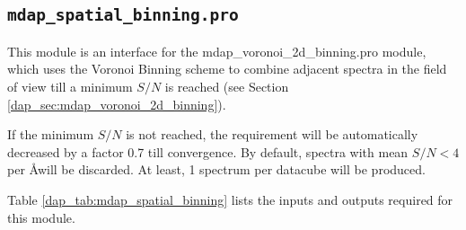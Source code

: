 \subsection{{\tt mdap\_spatial\_binning.pro}}
\label{dap_sec:mdap_spatial_binning}

This module is an interface for the mdap\_voronoi\_2d\_binning.pro
module, which uses the Voronoi Binning scheme to combine adjacent
spectra in the field of view till a minimum $S/N$ is reached (see
Section \ref{dap_sec:mdap_voronoi_2d_binning}).

If the minimum $S/N$ is not reached, the requirement will be
automatically decreased by a factor 0.7 till convergence. By default,
spectra with mean $S/N < 4$ per \AA will be discarded. At least, 1
spectrum per datacube will be produced.


Table \ref{dap_tab:mdap_spatial_binning} lists the inputs and outputs
required for this module.


